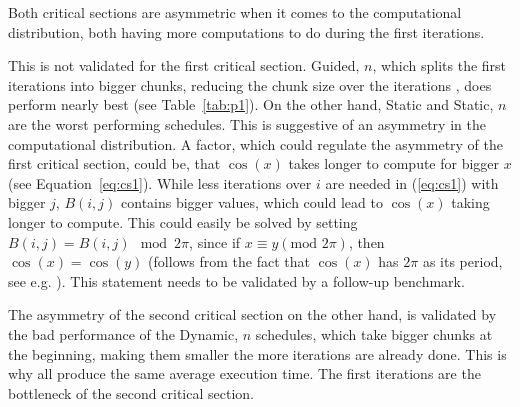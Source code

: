 \documentclass[twoside,11pt]{article}
\begin{document}




Both critical sections are asymmetric when it comes to the
computational distribution, both having more computations
to do during the first iterations.

This is not validated for the first critical section.
Guided, $n$, which splits the first iterations into bigger
chunks, reducing the chunk size over the iterations
\citep[see][]{lecture}, does perform nearly best (see
Table~\ref{tab:p1}).
On the other hand, Static and Static, $n$ are the worst
performing schedules. This is suggestive of an asymmetry
in the computational distribution.
A factor, which could regulate the asymmetry of the
first critical section, could be, that $\cos(x)$ takes
longer to compute for bigger $x$
(see Equation~\ref{eq:cs1}).
While less iterations over $i$ are needed in
(\ref{eq:cs1}) with bigger $j$, $B(i, j)$ contains bigger
values, which could lead to $\cos(x)$ taking longer to
compute.
This could easily be solved by
setting $B(i, j) = B(i, j) \mod 2\pi$, since if
$x \equiv y (\text{mod }2\pi)$, then $\cos(x) = \cos(y)$
(follows from the fact that $\cos(x)$ has $2\pi$ as its
period, see e.g. \citet{trig}).
This statement needs to be validated by a follow-up
benchmark.

The asymmetry of the second critical section on the other
hand, is validated by the bad performance of the Dynamic,
$n$ schedules, which take bigger chunks at the beginning,
making them smaller the more iterations are already done.
This is why all produce the same average execution time.
The first iterations are the bottleneck of the second
critical section.
\end{document}
